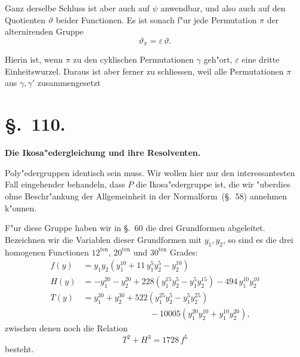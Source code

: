 \documentclass[12pt,a4paper]{article}
\theoremstyle{plain}
\begin{document}
Ganz derselbe Schluss ist aber auch auf $\psi$ anwendbar, und also auch auf den Quotienten $\vartheta$ beider Functionen. Es ist sonach f"ur jede Permutation $\pi$ der alternirenden Gruppe
\begin{equation}\tag{10}
\vartheta_\pi = \varepsilon\,\vartheta.
\end{equation}

Hierin ist, wenn $\pi$ zu den cyklischen Permutationen $\gamma$ geh"ort, $\varepsilon$ eine dritte Einheitswurzel. Daraus ist aber ferner zu schliessen, weil alle Permutationen $\pi$ aus $\gamma, \gamma'$ zusammengesetzt



\section*{\S.~110.}
\begin{center}
\large\bfseries Die Ikosa"edergleichung und ihre Resolventen.
\end{center}
\vspace{0.5em}

Poly"edergruppen identisch sein muss. Wir wollen hier nur den interessantesten Fall eingehender behandeln, dass $P$ die Ikosa"edergruppe ist, die wir "uberdies ohne Beschr"ankung der Allgemeinheit in der Normalform~(\S.~58) annehmen k"onnen.

F"ur diese Gruppe haben wir in \S.~60 die drei Grundformen abgeleitet. Bezeichnen wir die Variablen dieser Grundformen mit $y_1, y_2$, so sind es die drei homogenen Functionen $12^{\text{ten}}$, $20^{\text{ten}}$ und $30^{\text{ten}}$ Grades:
\begin{equation}\tag{9}
\begin{aligned}
f(y) &= y_1 y_2(y_1^{10} + 11\,y_1^5 y_2^5 - y_2^{10})\\
H(y) &= -y_1^{20} - y_2^{20} + 228(y_1^{15}y_2^5 - y_1^5 y_2^{15}) - 494\,y_1^{10}y_2^{10}\\
T(y) &= y_1^{30} + y_2^{30} + 522(y_1^{25}y_2^5 - y_1^5 y_2^{25})\\
&\qquad\qquad\qquad\qquad - 10005(y_1^{20}y_2^{10} + y_1^{10}y_2^{20}),
\end{aligned}
\end{equation}
zwischen denen noch die Relation
\begin{equation}\tag{10}
T^2 + H^3 = 1728\,f^5
\end{equation}
besteht.
\end{document}
